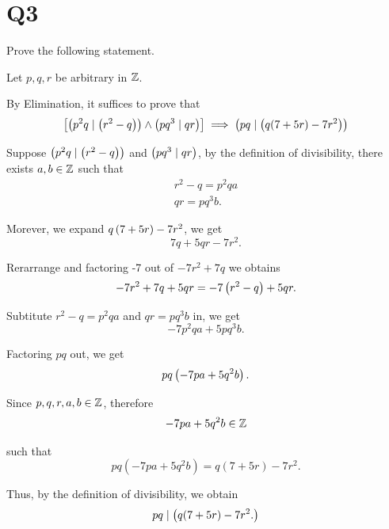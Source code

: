 \section{Q3}
Prove the following statement. 
\begin{solution}
    Let $p, q, r$ be arbitrary in $\mathbb{Z}$.
    
    By Elimination, it suffices to prove that 
    \begin{equation*}
        \left[\left(p^2q \mid \left(r^2 - q\right)\right) \wedge \left(pq^3 \mid qr\right)\right] \implies \left(pq \mid \left(q(7 + 5r) - 7r^2\right)\right)
    \end{equation*}

    Suppose $\left(p^2q \mid \left(r^2 - q\right)\right)$ and $ \left(pq^3 \mid qr\right)$, by the definition of divisibility, there exists $a, b \in \mathbb{Z}$ such that 
    \begin{gather*}
        r^2 - q = p^2qa \\
        qr = pq^3b. 
    \end{gather*}

    Morever, we expand $q\left(7 + 5r\right) - 7r^2$, we get 
    \begin{equation*}
        7q + 5qr - 7r^2.
    \end{equation*}

    Rerarrange and factoring -7 out of $-7r^2 + 7q$ we obtains 
    \begin{equation*}
        -7r^2 + 7q + 5qr = -7\left(r^2 - q\right) + 5qr. 
    \end{equation*}

    Subtitute $r^2 - q = p^2qa$ and $qr = pq^3b$ in, we get 
    \begin{equation*}
        -7p^2qa + 5pq^3b. 
    \end{equation*}

    Factoring $pq$ out, we get
    \begin{equation*}
        pq\left(-7pa + 5q^2b\right). 
    \end{equation*}

    Since $p, q, r, a, b \in \mathbb{Z}$, therefore
    \begin{equation*}
        -7pa + 5q^2b \in \mathbb{Z}
    \end{equation*}

    such that 
    \begin{equation*}
        pq(-7pa + 5q^2b) = q(7 + 5r) - 7r^2. 
    \end{equation*}

    Thus, by the definition of divisibility, we obtain 
    \begin{equation*}
        pq \mid \left(q (7 + 5r) - 7r^2. \right)
    \end{equation*}
\end{solution}